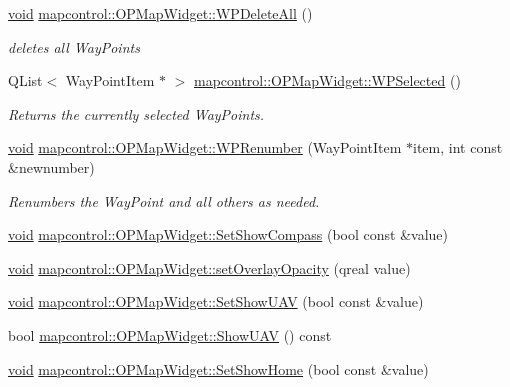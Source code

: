 \begin{DoxyCompactItemize}
\hyperlink{group___u_a_v_objects_plugin_ga444cf2ff3f0ecbe028adce838d373f5c}{void} \hyperlink{group___o_p_map_widget_ga2dd5bd06f443a496f6f81464ef44b614}{mapcontrol\-::\-O\-P\-Map\-Widget\-::\-W\-P\-Delete\-All} ()
\begin{DoxyCompactList}\small\item\em deletes all \-Way\-Points \end{DoxyCompactList}\item 
\-Q\-List$<$ \-Way\-Point\-Item $\ast$ $>$ \hyperlink{group___o_p_map_widget_ga6051fad972405dd8b2a27196b4569684}{mapcontrol\-::\-O\-P\-Map\-Widget\-::\-W\-P\-Selected} ()
\begin{DoxyCompactList}\small\item\em \-Returns the currently selected \-Way\-Points. \end{DoxyCompactList}\item 
\hyperlink{group___u_a_v_objects_plugin_ga444cf2ff3f0ecbe028adce838d373f5c}{void} \hyperlink{group___o_p_map_widget_gaba5ee1743df3dee15e552f21a0c5d141}{mapcontrol\-::\-O\-P\-Map\-Widget\-::\-W\-P\-Renumber} (\-Way\-Point\-Item $\ast$item, int const \&newnumber)
\begin{DoxyCompactList}\small\item\em \-Renumbers the \-Way\-Point and all others as needed. \end{DoxyCompactList}\item 
\hyperlink{group___u_a_v_objects_plugin_ga444cf2ff3f0ecbe028adce838d373f5c}{void} \hyperlink{group___o_p_map_widget_ga6f97b86b2d7a7ca6f5b7bb65a70b5a96}{mapcontrol\-::\-O\-P\-Map\-Widget\-::\-Set\-Show\-Compass} (bool const \&value)
\item 
\hyperlink{group___u_a_v_objects_plugin_ga444cf2ff3f0ecbe028adce838d373f5c}{void} \hyperlink{group___o_p_map_widget_ga989b4bdc242ebd97536cffb2be2193fc}{mapcontrol\-::\-O\-P\-Map\-Widget\-::set\-Overlay\-Opacity} (qreal value)
\item 
\hyperlink{group___u_a_v_objects_plugin_ga444cf2ff3f0ecbe028adce838d373f5c}{void} \hyperlink{group___o_p_map_widget_ga0ced0790f99341bffe4d71cd8f1f3d61}{mapcontrol\-::\-O\-P\-Map\-Widget\-::\-Set\-Show\-U\-A\-V} (bool const \&value)
\item 
bool \hyperlink{group___o_p_map_widget_ga07fb8db72de213248c524cae2b148d7a}{mapcontrol\-::\-O\-P\-Map\-Widget\-::\-Show\-U\-A\-V} () const 
\item 
\hyperlink{group___u_a_v_objects_plugin_ga444cf2ff3f0ecbe028adce838d373f5c}{void} \hyperlink{group___o_p_map_widget_gaa503c30b06667b16caa4190f8fa47f86}{mapcontrol\-::\-O\-P\-Map\-Widget\-::\-Set\-Show\-Home} (bool const \&value)

\end{DoxyCompactItemize}
